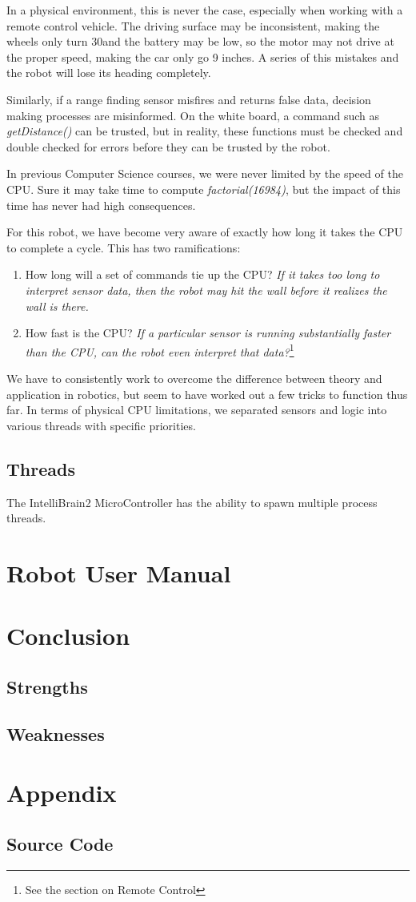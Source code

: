 \documentclass[12pt]{article}
\begin{document}
In a physical environment, this is never the case, especially when working with a remote control vehicle.  The driving surface may be inconsistent, making the wheels only turn 30\textdegree and the battery may be low, so the motor may not drive at the proper speed, making the car only go 9 inches.  A series of this mistakes and the robot will lose its heading completely.  

Similarly, if a range finding sensor misfires and returns false data, decision making processes are misinformed.  On the white board, a command such as \textit{getDistance()} can be trusted, but in reality, these functions must be checked and double checked for errors before they can be trusted by the robot.
\vspace{2mm}

In previous Computer Science courses, we were never limited by the speed of the CPU.  Sure it may take time to compute \textit{factorial(16984)}, but the impact of this time has never had high consequences.

For this robot, we have become very aware of exactly how long it takes the CPU to complete a cycle.  This has two ramifications:
\begin{enumerate}
\item How long will a set of commands tie up the CPU? \textit{If it takes too long to interpret sensor data, then the robot may hit the wall before it realizes the wall is there.}
\item How fast is the CPU? \textit{If a particular sensor is running substantially faster than the CPU, can the robot even interpret that data?}\footnote{See the section on Remote Control}
\end{enumerate}

\vspace{2mm}
We have to consistently work to overcome the difference between theory and application in robotics, but seem to have worked out a few tricks to function thus far.  In terms of physical CPU limitations, we separated sensors and logic into various threads with specific priorities.

\subsection{Threads}
The IntelliBrain2 MicroController has the ability to spawn multiple process threads.

\section{Robot User Manual}

\section{Conclusion}
\subsection{Strengths}
\subsection{Weaknesses}

\section{Appendix}
\subsection{Source Code}
\end{document}
